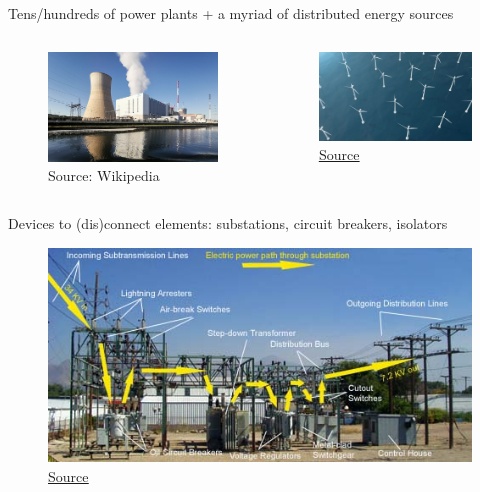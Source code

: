 \begin{frame}
{Tens/hundreds of power plants + a myriad of distributed energy sources}
\begin{columns}
\begin{figure}
\centering
\includegraphics[width=0.9\linewidth]{images/Tihange_Nuclear_Power_Station.jpg}
\caption*{\small{Source: Wikipedia}}
\end{figure}
\begin{figure}
\centering
\includegraphics[width=0.9\linewidth]{images/Offshore_Wind_Aerial_XL_721_420_80_s_c1.jpg}
\caption*{\href{https://www.greentechmedia.com/articles/read/another-major-oil-company-invests-in-clean-energy1}{\underline{Source}}}
\end{figure}
\end{columns}
\end{frame}

\begin{frame}
{Devices to (dis)connect elements: substations, circuit breakers, isolators}
\begin{figure}
\centering
\includegraphics[width=0.7\linewidth]{images/substation_energy_flow.jpg}
\caption*{\href{https://www.osha.gov/etools/electric-power/illustrated-glossary/sub-station}{\underline{Source}}}
\end{figure}
\end{frame}

